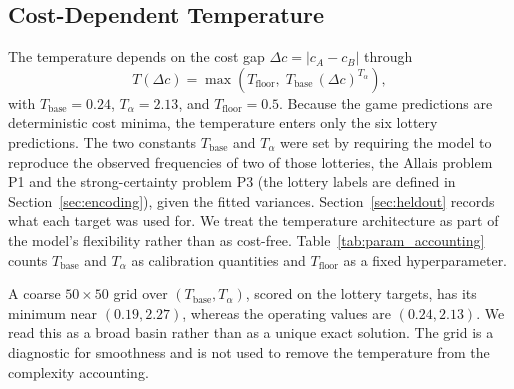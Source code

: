 \documentclass[journal]{IEEEtran}
\begin{document}
\subsection{Cost-Dependent Temperature}
\label{sec:temperature}

The temperature depends on the cost gap $\Delta c = |c_A - c_B|$ through
\begin{equation}
    T(\Delta c) = \max\!\left(T_{\text{floor}},\; T_{\text{base}}\, (\Delta c)^{T_\alpha}\right),
    \label{eq:temperature}
\end{equation}
with $T_{\text{base}} = 0.24$, $T_\alpha = 2.13$, and $T_{\text{floor}} = 0.5$.
Because the game predictions are deterministic cost minima, the temperature enters only the six lottery predictions.
The two constants $T_{\text{base}}$ and $T_\alpha$ were set by requiring the model to reproduce the observed frequencies of two of those lotteries, the Allais problem P1 and the strong-certainty problem P3 (the lottery labels are defined in Section~\ref{sec:encoding}), given the fitted variances.
Section~\ref{sec:heldout} records what each target was used for.
We treat the temperature architecture as part of the model's flexibility rather than as cost-free.
Table~\ref{tab:param_accounting} counts $T_{\text{base}}$ and $T_\alpha$ as calibration quantities and $T_{\text{floor}}$ as a fixed hyperparameter.

A coarse $50\times50$ grid over $(T_{\text{base}},T_\alpha)$, scored on the lottery targets, has its minimum near $(0.19,2.27)$, whereas the operating values are $(0.24,2.13)$.
We read this as a broad basin rather than as a unique exact solution.
The grid is a diagnostic for smoothness and is not used to remove the temperature from the complexity accounting.
\end{document}
